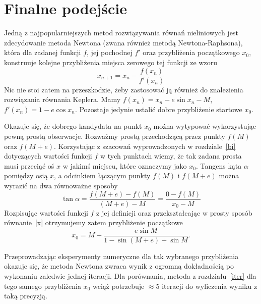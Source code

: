 \documentclass[11pt,wide,leqno]{article}
\begin{document}
    \section{Finalne podejście}
        Jedną z najpopularniejszych metod rozwiązywania równań nieliniowych
        jest zdecydowanie metoda Newtona (zwana również metodą Newtona-Raphsona), która dla zadanej
        funkcji \(f\), jej pochodnej \(f'\) oraz przybliżenia początkowego \(x_0\), konstruuje
        kolejne przybliżenia miejsca zerowego tej funkcji ze wzoru
        \begin{equation}
            x_{n+1} = x_n - \frac{f(x_n)}{f'(x_n)}
        \end{equation}
        Nic nie stoi zatem na przeszkodzie, żeby zastosować ją również do znalezienia rozwiązania
        równania Keplera. Mamy \(f(x_n) = x_n - e\sin x_n - M\),
        \(f'(x_n) = 1 - e\cos x_n\). Pozostaje jedynie ustalić dobre przybliżenie
        startowe \(x_0\).

        Okazuje się, że dobrego kandydata na punkt \(x_0\) można wytypować wykorzystując 
        pewną prostą obserwacje.
        Rozważmy prostą przechodzącą przez punkty \(f(M)\) oraz \(f(M + e)\). Korzystając z szacowań
        wyprowadzonych w rozdziale~\ref{bi} dotyczących wartości funkcji \(f\) w tych punktach wiemy, że tak zadana prosta musi przeciąć oś \(x\) w jakimś miejscu, które oznaczymy jako \(x_0\).
        Tangens kąta \(\alpha\) pomiędzy osią \(x\), a odcinkiem łączącym punkty \(f(M)\) i \(f(M + e)\) można wyrazić na dwa równoważne sposoby
        \begin{equation}\label{x}
            \tan \alpha = \frac{f(M + e) - f(M)}{(M + e) - M} = \frac{0 - f(M)}{x_0 - M}
        \end{equation}
        Rozpisując wartości funkcji \(f\) z jej definicji oraz przekształcając w prosty sposób równanie~\eqref{x} otrzymujemy zatem przybliżenie początkowe
        \begin{equation}\label{x0}
            x_0 = M + \frac{e\sin M}{1 - \sin(M + e) + \sin M}.
        \end{equation}

        Przeprowadzając eksperymenty numeryczne dla tak wybranego przybliżenia okazuje się, że metoda Newtona
        zwraca wynik z ogromną dokładnością po wykonaniu zaledwie jednej iteracji. Dla porównania, metoda z rozdziału~\ref{iter}
        dla tego samego przybliżenia \(x_0\) wciąż potrzebuje \(\approx 5\) iteracji do wyliczenia wyniku z taką precyzją.
        
\end{document}
